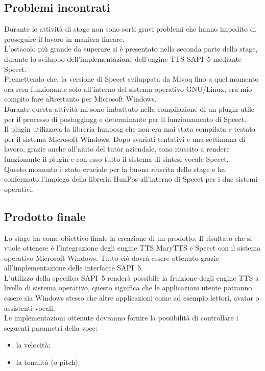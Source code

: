 \subsection{Problemi incontrati}
Durante le attività di stage non sono sorti gravi problemi che hanno impedito di proseguire il lavoro in maniera lineare.\\
L'ostacolo più grande da superare si è presentato nella seconda parte dello stage, durante lo sviluppo dell'implementazione dell'engine TTS SAPI~5 mediante Speect.\\
Premettendo che, la versione di Speect sviluppata da Mivoq fino a quel momento era resa funzionante solo all'interno del sistema operativo GNU/Linux, era mio compito fare altrettanto per Microsoft Windows.\\
Durante questa attività mi sono imbattuto nella compilazione di un plugin utile per il processo di \gls{postaggingg} e determinante per il funzionamento di Speect.\\
Il plugin utilizzava la libreria \gls{hunposg} che non era mai stata compilata e testata per il sistema Microsoft Windows.
Dopo svariati tentativi e una settimana di lavoro, grazie anche all'aiuto del tutor aziendale, sono riuscito a rendere funzionante il plugin e con esso tutto il sistema di sintesi vocale Speect.\\
Questo momento è stato cruciale per la buona riuscita dello stage e ha confermato l'impiego della libreria HunPos all'interno di Speect per i due sistemi operativi.

\subsection{Prodotto finale}
Lo stage ha come obiettivo finale la creazione di un prodotto.
Il risultato che si vuole ottenere è l'integrazione degli engine TTS MaryTTS e Speect con il sistema operativo Microsoft Windows. Tutto ciò dovrà essere ottenuto grazie all'implementazione delle interfacce SAPI~5.\\
L'utilizzo della specifica SAPI~5 renderà possibile la fruizione degli engine TTS a livello di sistema operativo, questo significa che le applicazioni utente potranno essere sia Windows stesso che altre applicazioni come ad esempio lettori, avatar o assistenti vocali.\\
Le implementazioni ottenute dovranno fornire la possibilità di controllare i seguenti parametri della voce:
\begin{itemize}
	\item la velocità;
	\item la tonalità (o pitch).
\end{itemize}

